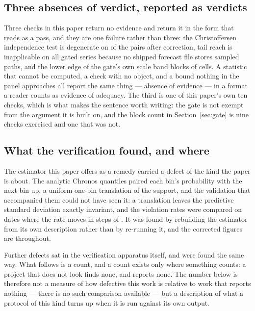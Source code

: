 \documentclass[preprint,11pt,authoryear]{elsarticle}
\newcommand{\1}{\boldsymbol{1}}
\begin{document}
\subsection{Three absences of verdict, reported as verdicts}
\label{sec:absences}

Three checks in this paper return no evidence and return it in the form that
reads as a pass, and they are one failure rather than three: the Christoffersen
independence test is degenerate on \nMainCCUndefined{} of the \nMainPairs{} pairs
after correction, tail reach is inapplicable on all \nGateSeries{} gated series
because no shipped forecast file stores sampled paths, and the lower edge of the
gate's own scale band blocks \nGapCellsLowerBlocks{} of \nGapCellsTotal{} cells.
A statistic that cannot be computed, a check with no object, and a bound nothing
in the panel approaches all report the same thing --- absence of evidence --- in
a format a reader counts as evidence of adequacy. The third is one of this
paper's own ten checks, which is what makes the sentence worth writing: the gate
is not exempt from the argument it is built on, and the block count in
Section~\ref{sec:gate} is nine checks exercised and one that was not.

\subsection{What the verification found, and where}
\label{sec:harness_limits}

The estimator this paper offers as a remedy carried a defect of the kind the
paper is about. The analytic Chronos quantiles paired each bin's probability with
the next bin up, a uniform one-bin translation of the support, and the validation
that accompanied them could not have seen it: a translation leaves the predictive
standard deviation exactly invariant, and the violation rates were compared on
\nLitAnalyticDates{} dates where the rate moves in steps of \nLitAnalyticGrid.
It was found by rebuilding the estimator from its own description rather than by
re-running it, and the corrected figures are throughout.

Further defects sat in the verification apparatus itself, and were found the
same way. What follows is a count, and a count exists only where something
counts: a project that does not look finds none, and reports none. The number
below is therefore not a measure of how defective this work is relative to work
that reports nothing --- there is no such comparison available --- but a
description of what a protocol of this kind turns up when it is run against its
own output.
\end{document}
